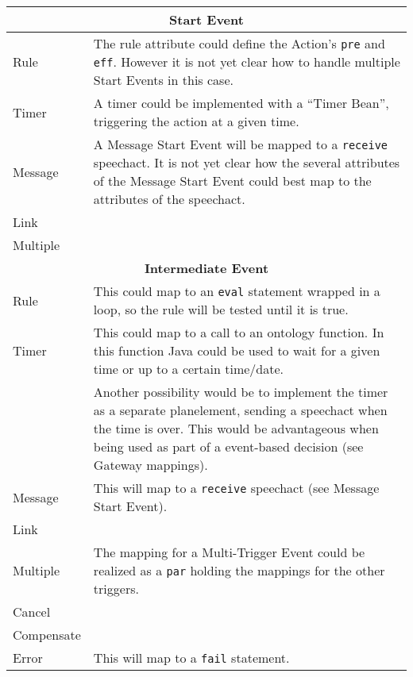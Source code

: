 \begin{longtable}{|p{3.5cm}|p{10.5cm}|}
\hline
\multicolumn{2}{|c|}{\textbf{Start Event}}
\\\hline
Rule                    & The rule attribute could define the Action's \verb|pre| and \verb|eff|. However it is not yet clear how to handle multiple Start Events in this case.
\\\hline
Timer                   & A timer could be implemented with a ``Timer Bean'', triggering the action at a given time.
\\\hline
Message                 & A Message Start Event will be mapped to a \verb|receive| speechact. It is not yet clear how the several attributes of the Message Start Event could best map to the attributes of the speechact.
\\\hline
Link                    &
\\\hline
Multiple                & 
\\\hline

\hline
\multicolumn{2}{|c|}{\textbf{Intermediate Event}}
\\\hline
Rule                    & This could map to an \verb|eval| statement wrapped in a loop, so the rule will be tested until it is true.
\\\hline
Timer                   & This could map to a call to an ontology function. In this function Java could be used to wait for a given time or up to a certain time/date. \\ & Another possibility would be to implement the timer as a separate planelement, sending a speechact when the time is over. This would be advantageous when being used as part of a event-based decision (see Gateway mappings).
\\\hline
Message                 & This will map to a \verb|receive| speechact (see Message Start Event).
\\\hline
Link                    & 
\\\hline
Multiple                & The mapping for a Multi-Trigger Event could be realized as a \verb|par| holding the mappings for the other triggers.
\\\hline
Cancel                  &  
\\\hline
Compensate              &  
\\\hline
Error                   & This will map to a \verb|fail| statement.
\\\hline


\end{longtable}
